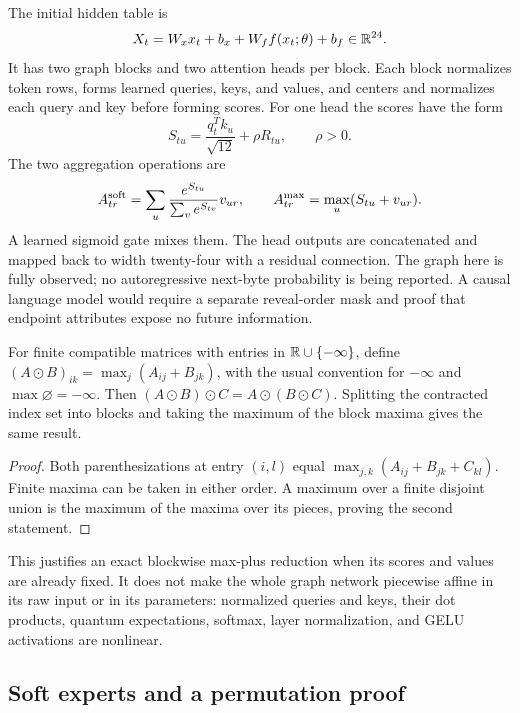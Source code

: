The initial hidden table is
\[
 X_t=W_x x_t+b_x+W_f f(x_t;\theta)+b_f\in\mathbb{R}^{24}.
\]
It has two graph blocks and two attention heads per block. Each block
normalizes token rows, forms learned queries, keys, and values, and centers
and normalizes each query and key before forming scores. For one head the
scores have the form
\[
 S_{tu}=\frac{q_t^T k_u}{\sqrt{12}}+\rho R_{tu},\qquad \rho>0.
\]
The two aggregation operations are
\[
 A^{\rm soft}_{t r}=\sum_u
 \frac{e^{S_{tu}}}{\sum_v e^{S_{tv}}}v_{ur},
 \qquad
 A^{\rm max}_{t r}=\max_u(S_{tu}+v_{ur}).
\]
A learned sigmoid gate mixes them. The head outputs are concatenated and
mapped back to width twenty-four with a residual connection. The graph
here is fully observed; no autoregressive next-byte probability is being
reported. A causal language model would require a separate reveal-order
mask and proof that endpoint attributes expose no future information.

\begin{lemma}
\label{qt:maxplus}
For finite compatible matrices with entries in
$\mathbb{R}\cup\{-\infty\}$, define
$(A\odot B)_{ik}=\max_j(A_{ij}+B_{jk})$, with the usual convention for
$-\infty$ and $\max\varnothing=-\infty$. Then $(A\odot B)\odot C=A\odot(B\odot C)$.
Splitting the contracted index set into blocks and taking the maximum of
the block maxima gives the same result.
\end{lemma}
\begin{proof}
Both parenthesizations at entry $(i,l)$ equal
$\max_{j,k}(A_{ij}+B_{jk}+C_{kl})$. Finite maxima can be taken in either
order. A maximum over a finite disjoint union is the maximum of the maxima
over its pieces, proving the second statement.
\end{proof}

This justifies an exact blockwise max-plus reduction when its scores and
values are already fixed. It does not make the whole graph network
piecewise affine in its raw input or in its parameters: normalized
queries and keys, their dot products, quantum expectations, softmax,
layer normalization, and GELU activations are nonlinear.

\subsection{Soft experts and a permutation proof}

